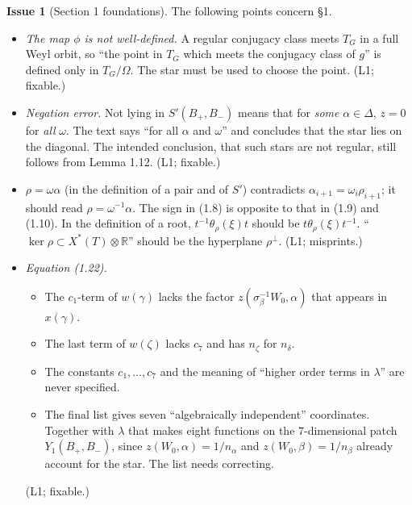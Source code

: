\documentclass[12pt,letterpaper]{article}
\newcommand{\Lv}[1]{\textsf{L#1}}
\theoremstyle{definition}
\newtheorem{issue}{Issue}[section]
\begin{document}
\begin{issue}[Section 1 foundations]\label{iss:sec1}
The following points concern \S1.
\begin{itemize}
\item \emph{The map $\phi$ is not well-defined.} A regular conjugacy class
meets $T_G$ in a full Weyl orbit, so ``the point in $T_G$ which meets the
conjugacy class of $g$'' is defined only in $T_G/\Omega$. The star must be used
to choose the point. (\Lv{1}; fixable.)
\item \emph{Negation error.} Not lying in $S'(B_+,B_-)$ means that for
\emph{some} $\alpha\in\Delta$, $z=0$ for \emph{all} $\omega$. The text says
``for all $\alpha$ and $\omega$'' and concludes that the star lies on the
diagonal. The intended conclusion, that such stars are not regular, still
follows from Lemma 1.12. (\Lv{1}; fixable.)
\item $\rho=\omega\alpha$ (in the definition of a pair and of $S'$)
contradicts $\alpha_{i+1}=\omega_i\rho_{i+1}$; it should read
$\rho=\omega^{-1}\alpha$. The sign in (1.8) is opposite to that in (1.9) and
(1.10). In the definition of a root, $t^{-1}\theta_\rho(\xi)t$ should be
$t\theta_\rho(\xi)t^{-1}$. ``$\ker\rho\subset X^*(T)\otimes\mathbb R$'' should
be the hyperplane $\rho^\perp$. (\Lv{1}; misprints.)
\item \emph{Equation (1.22).}
\begin{itemize}
\item The $c_1$-term of $w(\gamma)$ lacks the factor
$z(\sigma_\beta^{-1}W_0,\alpha)$ that appears in $x(\gamma)$.
\item The last term of $w(\zeta)$ lacks $c_7$ and has $n_\zeta$ for $n_\delta$.
\item The constants $c_1,\dots,c_7$ and the meaning of ``higher order terms in
$\lambda$'' are never specified.
\item The final list gives seven ``algebraically independent'' coordinates.
Together with $\lambda$ that makes eight functions on the $7$-dimensional
patch $Y_1(B_+,B_-)$, since $z(W_0,\alpha)=1/n_\alpha$ and
$z(W_0,\beta)=1/n_\beta$ already account for the star. The list needs
correcting.
\end{itemize}
(\Lv{1}; fixable.)
\end{itemize}
\end{issue}
\end{document}
